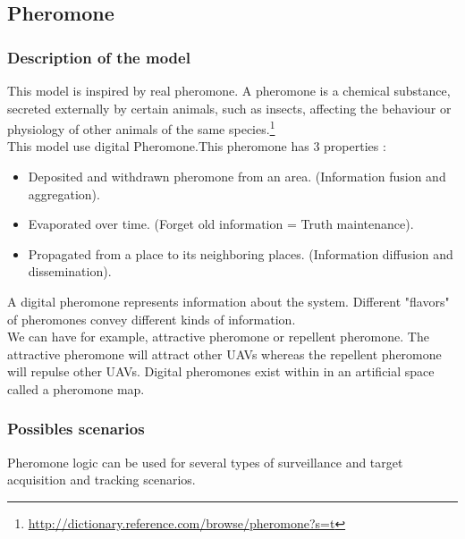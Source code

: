 \newpage

\subsection{Pheromone}

\subsubsection{Description of the model}

This model is inspired by real pheromone. A pheromone is a chemical substance, secreted externally by certain animals, such as insects, affecting the behaviour or physiology of other animals of the same species.\footnote{\url{http://dictionary.reference.com/browse/pheromone?s=t}}\\
This model use digital Pheromone.This pheromone has 3 properties :

\begin{itemize}
\item  Deposited and withdrawn pheromone from an area. (Information fusion and aggregation).
\item  Evaporated over time. (Forget old information = Truth maintenance).
\item  Propagated from a place to its neighboring places. (Information diffusion and dissemination). 
\end{itemize}

A  digital  pheromone  represents  information  about  the  system. Different  "flavors"  of  pheromones convey different kinds of information.\\ We can have for example, attractive pheromone or repellent pheromone. The attractive pheromone will attract other UAVs whereas the repellent pheromone will repulse other UAVs. Digital pheromones exist within in an artificial space called a pheromone map.

\subsubsection{Possibles scenarios}

Pheromone logic  can  be  used  for  several  types  of  surveillance  and target  acquisition  and  tracking scenarios.

